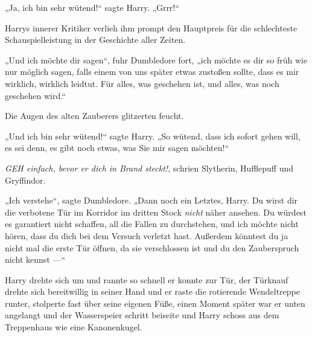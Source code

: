 „Ja, ich bin sehr wütend!“ sagte Harry.
„Grrr!“

Harrys innerer Kritiker verlieh ihm prompt den Hauptpreis für die schlechteste Schauspielleistung in der Geschichte aller Zeiten.

„Und ich möchte dir sagen“, fuhr Dumbledore fort, „ich möchte es dir so früh wie nur möglich sagen, falls einem von uns später etwas zustoßen sollte, dass es mir wirklich, wirklich leidtut. Für alles, was geschehen ist, und alles, was noch geschehen wird.“

Die Augen des alten Zauberers glitzerten feucht.

„Und ich bin sehr wütend!“ sagte Harry.
„So wütend, dass ich sofort gehen will, es sei denn, es gibt noch etwas, was Sie mir sagen möchten!“

\emph{GEH einfach, bevor er dich in Brand steckt!}, schrien Slytherin, Hufflepuff und Gryffindor.

„Ich verstehe“, sagte Dumbledore.
„Dann noch ein Letztes, Harry. Du wirst dir die verbotene Tür im Korridor im dritten Stock \emph{nicht} näher ansehen. Du würdest es garantiert nicht schaffen, all die Fallen zu durchstehen, und ich möchte nicht hören, dass du dich bei dem Versuch verletzt hast. Außerdem könntest du ja nicht mal die erste Tür öffnen, da sie verschlossen ist und du den Zauberspruch  nicht kennst —“

Harry drehte sich um und rannte so schnell er konnte zur Tür, der Türknauf drehte sich bereitwillig in seiner Hand und er raste die rotierende Wendeltreppe runter, stolperte fast über seine eigenen Füße, einen Moment später war er unten angelangt und der Wasserspeier schritt beiseite und Harry schoss aus dem Treppenhaus wie eine Kanonenkugel.

